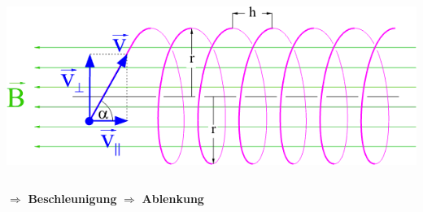 \documentclass[10pt,t]{beamer}
\begin{document}
\begin{frame}
\begin{columns}
    \includegraphics[width=\textwidth]{beschleuniger-lorentzkraft-spirale}
\end{columns}
\vspace*{1em}
\begin{columns}
\centering$\boldsymbol{\Rightarrow}$ \textbf{Beschleunigung}
\centering$\boldsymbol{\Rightarrow}$ \textbf{Ablenkung}
\end{columns}
\end{frame}
\end{document}
